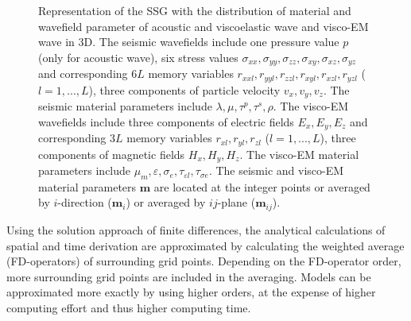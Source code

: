 \documentclass[pdftex,a4paper,parskip,listof=totoc,bibliography=totoc,onehalfspacing,12pt]{scrreprt}
\begin{document}
\begin{figure}
\caption[]{Representation of the SSG with the distribution of material and wavefield parameter of acoustic and viscoelastic wave \citep{graves1996simulating} and visco-EM wave \citep{yee1966numerical} in 3D. The seismic wavefields include one pressure value $p$ (only for acoustic wave), six stress values $\sigma_{xx}, \sigma_{yy}, \sigma_{zz}, \sigma_{xy}, \sigma_{xz}, \sigma_{yz}$ and corresponding $6L$ memory variables $r_{xxl}, r_{yyl}, r_{zzl}, r_{xyl}, r_{xzl}, r_{yzl}$ ($l=1,...,L$), three components of particle velocity $v_x, v_y, v_z$. The seismic material parameters include $\lambda, \mu, \tau^p, \tau^s, \rho$. The visco-EM wavefields include three components of electric fields $E_x, E_y, E_z$ and corresponding $3L$ memory variables $r_{xl}, r_{yl}, r_{zl}$ ($l=1,...,L$), three components of magnetic fields $H_x, H_y, H_z$. The visco-EM material parameters include $\mu_m, \varepsilon, \sigma_e, \tau_{\varepsilon l}, \tau_{\sigma e}$. The seismic and visco-EM material parameters $\mathbf{m}$ are located at the integer points or averaged by $i$-direction ($\mathbf{m}_i$) or averaged by $ij$-plane ($\mathbf{m}_{ij}$).}
\label{fig:StagGrid3D}
\end{figure}

Using the solution approach of finite differences, the analytical calculations of spatial and time derivation are approximated by calculating the weighted average (FD-operators) of surrounding grid points. Depending on the FD-operator order, more surrounding grid points are included in the averaging. Models can be approximated more exactly by using higher orders, at the expense of higher computing effort and thus higher computing time.
\end{document}
